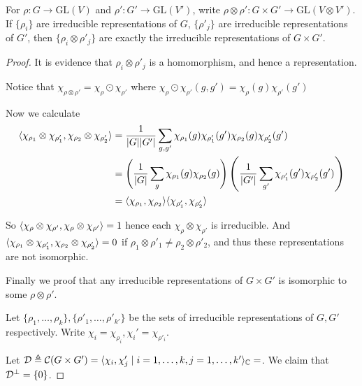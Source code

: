 \begin{theorem}
For $\rho: G\to \text{GL}(V)$ and $\rho': G'\to \text{GL}(V')$, write
$\rho\otimes\rho' : G \times G' \to \text{GL}(V\otimes V')$.
If $\{ \rho_i \}$ are irreducible representations of $G$,
$\{ \rho'_j \}$ are irreducible representations of $G'$, then
$\{ \rho_i \otimes \rho'_j \}$ are exactly the irreducible
representations of $G \times G'$.

\begin{proof}
  It is evidence that $\rho_i \otimes \rho'_j$ is a homomorphism, and hence
  a representation.

  Notice that $\chi_{\rho \otimes \rho'} = \chi_\rho \odot \chi_{\rho'}$ where
  $\chi_\rho \odot \chi_{\rho'}(g, g') = \chi_\rho(g) \chi_{\rho'}(g')$

  Now we calculate 
  \begin{align*}
    \langle\chi_{\rho_1} \otimes \chi_{\rho'_1}, \chi_{\rho_2} \otimes \chi_{\rho'_2}\rangle
    &= \frac{1}{\lvert G\rvert\lvert G'\rvert} \sum_{g, g'} \chi_{\rho_1}(g) \chi_{\rho'_1}(g') 
    \chi_{\rho_2}(g) \chi_{\rho'_2}(g')  \\
    &= \left( \frac{1}{\lvert G\rvert} \sum_{g} \chi_{\rho_1}(g) \chi_{\rho_2}(g) \right)
    \left( \frac{1}{\lvert G'\rvert} \sum_{g'} \chi_{\rho'_1}(g') \chi_{\rho'_2}(g') \right) \\
    &= \langle\chi_{\rho_1}, \chi_{\rho_2}\rangle \langle\chi_{\rho'_1}, \chi_{\rho'_2}\rangle
  \end{align*}

  So $\langle\chi_{\rho} \otimes \chi_{\rho'}, \chi_{\rho} \otimes \chi_{\rho'}\rangle = 1$ hence
  each $\chi_{\rho} \otimes \chi_{\rho'}$ is irreducible.
  And $\langle\chi_{\rho_1} \otimes \chi_{\rho'_1}, \chi_{\rho_2} \otimes \chi_{\rho'_2}\rangle = 0$ 
  if $\rho_1 \otimes \rho'_1 \neq \rho_2 \otimes \rho'_2$, and thus these representations are
  not isomorphic.

  Finally we proof that any irreducible representations of $G\times G'$ is isomorphic to some
  $\rho \otimes \rho'$.

  Let $\{\rho_1,\dots,\rho_k\}, \{\rho'_1,\dots,\rho'_{k'}\}$ be the sets
  of irreducible representations of $G, G'$ respectively.
  Write $\chi_i = \chi_{\rho_i}, \chi_i' = \chi_{\rho'_i}$.

  Let $\mathcal{D} \triangleq \mathcal{C}(G\times G') = \langle\chi_i, \chi_j' \mid
    i = 1,\dots,k, j = 1,\dots,k'\rangle_{\mathbb{C}} = $. We claim that $\mathcal{D}^\perp = \{0\}$.


\end{proof}
\end{theorem}
